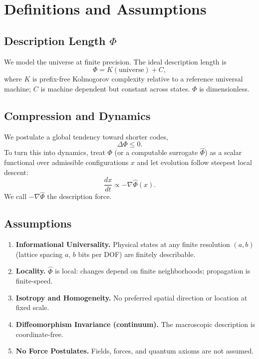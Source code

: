 \documentclass[aps,preprint,onecolumn,longbibliography,nofootinbib]{revtex4-2}
\numberwithin{equation}{section}        %
\begin{document}
\maketitle
{}
\thispagestyle{empty}
\vspace{-0.5em}

\section{Definitions and Assumptions}

\subsection{Description Length $\Phi$}
We model the universe at finite precision. The ideal description length is
\begin{equation}
\Phi = K(\text{universe}) + C, \label{eq:Kdef}
\end{equation}
where $K$ is prefix-free Kolmogorov complexity relative to a reference universal machine; $C$ is machine dependent but constant across states. $\Phi$ is dimensionless.

\subsection{Compression and Dynamics}
We postulate a global tendency toward shorter codes,
\begin{equation}
\Delta \Phi \le 0. \label{eq:compressive}
\end{equation}
To turn this into dynamics, treat $\Phi$ (or a computable surrogate $\widehat\Phi$) as a scalar functional over admissible configurations $x$ and let evolution follow steepest local descent:
\begin{equation}
\frac{dx}{dt} \propto -\nabla \widehat\Phi(x). \label{eq:desc}
\end{equation}
We call $-\nabla\widehat\Phi$ the description force.

\subsection*{Assumptions}
\begin{enumerate}
\item \textbf{Informational Universality.} Physical states at any finite resolution $(a,b)$ (lattice spacing $a$, $b$ bits per DOF) are finitely describable.
\item \textbf{Locality.} $\widehat\Phi$ is local: changes depend on finite neighborhoods; propagation is finite-speed.
\item \textbf{Isotropy and Homogeneity.} No preferred spatial direction or location at fixed scale.
\item \textbf{Diffeomorphism Invariance (continuum).} The macroscopic description is coordinate-free.
\item \textbf{No Force Postulates.} Fields, forces, and quantum axioms are not assumed.
\end{enumerate}
\end{document}

